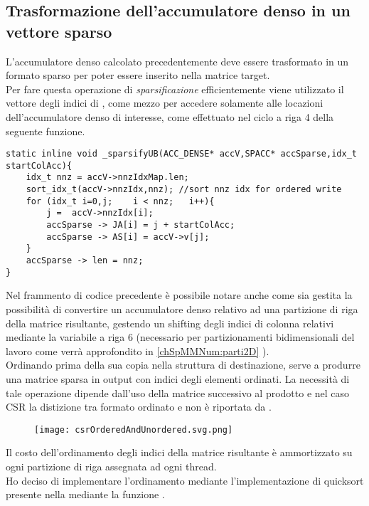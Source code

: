 \subsection{Trasformazione dell'accumulatore denso in un vettore sparso}	\label{chSpMMNum:sparsify}
L'accumulatore denso calcolato precedentemente deve essere trasformato in un formato sparso per poter essere 
inserito nella matrice target.\\
Per fare questa operazione di \emph{sparsificazione} efficientemente viene utilizzato il vettore degli indici di ,
come mezzo per accedere solamente alle locazioni dell'accumulatore denso  di interesse,
come effettuato nel ciclo a riga 4 della seguente funzione.\\
\begin{lstlisting}
static inline void _sparsifyUB(ACC_DENSE* accV,SPACC* accSparse,idx_t startColAcc){
    idx_t nnz = accV->nnzIdxMap.len;
    sort_idx_t(accV->nnzIdx,nnz); //sort nnz idx for ordered write
    for (idx_t i=0,j;    i < nnz;   i++){
        j =  accV->nnzIdx[i];
        accSparse -> JA[i] = j + startColAcc;
        accSparse -> AS[i] = accV->v[j];
    }
    accSparse -> len = nnz;
}
\end{lstlisting}
Nel frammento di codice precedente è possibile notare anche come sia gestita 
la possibilità di convertire un accumulatore denso relativo ad una partizione di riga della matrice risultante, 
gestendo un shifting degli indici di colonna \nnz relativi mediante la variabile  a riga 6
(necessario per partizionamenti bidimensionali del lavoro come verrà approfondito in \ref{chSpMMNum:parti2D} ).\\
Ordinando  prima della sua copia nella struttura di destinazione, 
serve a produrre una matrice sparsa in output con indici degli elementi \nnz ordinati.
La necessità di tale operazione dipende dall'uso della matrice successivo al prodotto 
e nel caso CSR la distizione tra formato ordinato e non è riportata da \cite{adaptiveTilingSpMM}.\\
\begin{figure}[h!]
  \centering \texttt{[image: csrOrderedAndUnordered.svg.png]}
  \caption[Distinzione tra matrici CSR con indici di colonna in  (non) ordinati]
  \decoRule \label{fig:layeredGraphInnerProduct}
\end{figure}
Il costo dell'ordinamento degli indici della matrice risultante è ammortizzato su ogni partizione di riga assegnata ad ogni thread.\\
Ho deciso di implementare l'ordinamento mediante l'implementazione di quicksort
presente nella  mediante la funzione .\\


